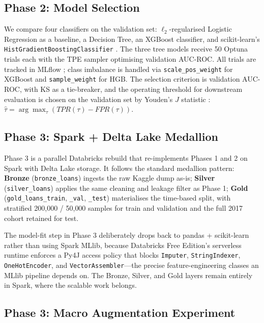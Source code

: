 \documentclass[conference]{IEEEtran}
\begin{document}
\subsection{Phase 2: Model Selection}

We compare four classifiers on the validation set: $\ell_2$-regularised
Logistic Regression as a baseline, a Decision Tree, an XGBoost
\cite{chen2016xgboost} classifier, and scikit-learn's
\texttt{HistGradientBoostingClassifier} \cite{pedregosa2011scikit}. The
three tree models receive 50 Optuna \cite{akiba2019optuna} trials each with
the TPE sampler optimising validation AUC-ROC. All trials are tracked in
MLflow \cite{mlflow}; class imbalance is handled via
\texttt{scale\_pos\_weight} for XGBoost and \texttt{sample\_weight} for
HGB. The selection criterion is validation AUC-ROC, with KS as a
tie-breaker, and the operating threshold for downstream evaluation is
chosen on the validation set by Youden's $J$ statistic
\cite{youden1950index}: $\hat{\tau} = \arg\max_\tau (TPR(\tau) - FPR(\tau))$.

\subsection{Phase 3: Spark + Delta Lake Medallion}

Phase 3 is a parallel Databricks rebuild that re-implements Phases 1 and 2
on Spark \cite{zaharia2016spark} with Delta Lake \cite{armbrust2020delta}
storage. It follows the standard medallion pattern: \textbf{Bronze}
(\texttt{bronze\_loans}) ingests the raw Kaggle dump as-is; \textbf{Silver}
(\texttt{silver\_loans}) applies the same cleaning and leakage filter as
Phase 1; \textbf{Gold} (\texttt{gold\_loans\_train}, \texttt{\_val},
\texttt{\_test}) materialises the time-based split, with stratified
200{,}000 / 50{,}000 samples for train and validation and the full 2017
cohort retained for test.

The model-fit step in Phase 3 deliberately drops back to pandas + scikit-learn
rather than using Spark MLlib, because Databricks Free Edition's serverless
runtime enforces a Py4J access policy that blocks
\texttt{Imputer}, \texttt{StringIndexer}, \texttt{OneHotEncoder}, and
\texttt{VectorAssembler}---the precise feature-engineering classes an MLlib
pipeline depends on. The Bronze, Silver, and Gold layers remain entirely
in Spark, where the scalable work belongs.

\subsection{Phase 3: Macro Augmentation Experiment}
\end{document}

